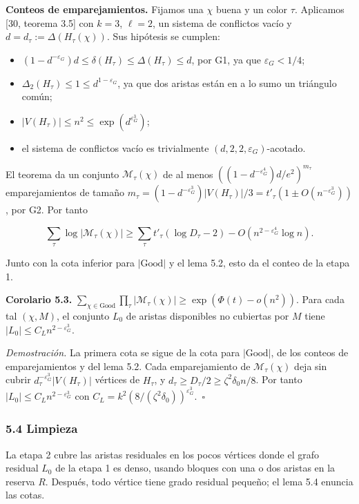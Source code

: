 \documentclass[spanish,11pt,a4paper]{article}
\providecommand{\tightlist}{\setlength{\itemsep}{0pt}\setlength{\parskip}{0pt}}
\begin{document}
\textbf{Conteos de emparejamientos.} Fijamos una \(\chi\) buena y un color \(\tau\). Aplicamos {[}30, teorema 3.5{]} con \(k=3\), \(\ell=2\), un sistema de conflictos vacío y \(d=d_\tau:=\Delta(H_\tau(\chi))\). Sus hipótesis se cumplen:

\begin{itemize}
\tightlist
\item
  \((1-d^{-\varepsilon_G})d\le\delta(H_\tau)\le\Delta(H_\tau)\le d\), por G1, ya que \(\varepsilon_G<1/4\);
\item
  \(\Delta_2(H_\tau)\le1\le d^{1-\varepsilon_G}\), ya que dos aristas están en a lo sumo un triángulo común;
\item
  \(|V(H_\tau)|\le n^2\le\exp(d^{\varepsilon_G^3})\);
\item
  el sistema de conflictos vacío es trivialmente \((d,2,2,\varepsilon_G)\)-acotado.
\end{itemize}

El teorema da un conjunto \(\mathcal M_\tau(\chi)\) de al menos \(((1-d^{-\varepsilon_G^4})d/e^2)^{m_\tau}\) emparejamientos de tamaño \(m_\tau=(1-d^{-\varepsilon_G^3})|V(H_\tau)|/3=t'_\tau(1\pm O(n^{-\varepsilon_G^3}))\), por G2. Por tanto

\nopagebreak[4]
\[\sum_\tau\log|\mathcal M_\tau(\chi)|\ge\sum_\tau t'_\tau(\log D_\tau-2)-O(n^{2-\varepsilon_G^4}\log n).\]

Junto con la cota inferior para \(|\mathrm{Good}|\) y el lema 5.2, esto da el conteo de la etapa 1.

\textbf{Corolario 5.3.} \(\sum_{\chi\in\mathrm{Good}}\prod_\tau|\mathcal M_\tau(\chi)|\ge\exp(\Phi(t)-o(n^2))\). Para cada tal \((\chi,M)\), el conjunto \(L_0\) de aristas disponibles no cubiertas por \(M\) tiene \(|L_0|\le C_Ln^{2-\varepsilon_G^3}\).

\emph{Demostración.} La primera cota se sigue de la cota para \(|\mathrm{Good}|\), de los conteos de emparejamientos y del lema 5.2. Cada emparejamiento de \(\mathcal M_\tau(\chi)\) deja sin cubrir \(d_\tau^{-\varepsilon_G^3}|V(H_\tau)|\) vértices de \(H_\tau\), y \(d_\tau\ge D_\tau/2\ge\zeta^2\delta_0n/8\). Por tanto \(|L_0|\le C_Ln^{2-\varepsilon_G^3}\) con \(C_L=k^2(8/(\zeta^2\delta_0))^{\varepsilon_G^3}\).~\(\square\)

\subsubsection{5.4 Limpieza}\label{limpieza}

La etapa 2 cubre las aristas residuales en los pocos vértices donde el grafo residual \(L_0\) de la etapa 1 es denso, usando bloques con una o dos aristas en la reserva \(R\). Después, todo vértice tiene grado residual pequeño; el lema 5.4 enuncia las cotas.
\end{document}
